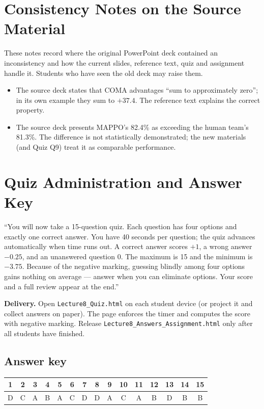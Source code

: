 \documentclass[11pt]{article}
\begin{document}
\section{Consistency Notes on the Source Material}These notes record where the original PowerPoint deck contained an inconsistency and how the current slides, reference text, quiz and assignment handle it. Students who have seen the old deck may raise them.\begin{itemize}\item The source deck states that COMA advantages ``sum to approximately zero''; in its own example they sum to $+37.4$. The reference text explains the correct property.\item The source deck presents MAPPO's 82.4\% as exceeding the human team's 81.3\%. The difference is not statistically demonstrated; the new materials (and Quiz Q9) treat it as comparable performance.\end{itemize}

\section{Quiz Administration and Answer Key}

\begin{sayit}``You will now take a 15-question quiz. Each question has four options and exactly one correct answer. You have 40 seconds per question; the quiz advances automatically when time runs out. A correct answer scores $+1$, a wrong answer $-0.25$, and an unanswered question 0. The maximum is 15 and the minimum is $-3.75$. Because of the negative marking, guessing blindly among four options gains nothing on average --- answer when you can eliminate options. Your score and a full review appear at the end.''\end{sayit}

\textbf{Delivery.} Open \texttt{Lecture8\_Quiz.html} on each student device (or project it and collect answers on paper). The page enforces the timer and computes the score with negative marking. Release \texttt{Lecture8\_Answers\_Assignment.html} only after all students have finished.

\subsection*{Answer key}\begin{center}\small\renewcommand{\arraystretch}{1.3}\begin{tabular}{|c|c|c|c|c|c|c|c|c|c|c|c|c|c|c|}\hline \textbf{1} & \textbf{2} & \textbf{3} & \textbf{4} & \textbf{5} & \textbf{6} & \textbf{7} & \textbf{8} & \textbf{9} & \textbf{10} & \textbf{11} & \textbf{12} & \textbf{13} & \textbf{14} & \textbf{15}\\\hline D & C & A & B & A & C & D & D & A & C & A & B & D & B & B\\\hline\end{tabular}\end{center}
\end{document}
